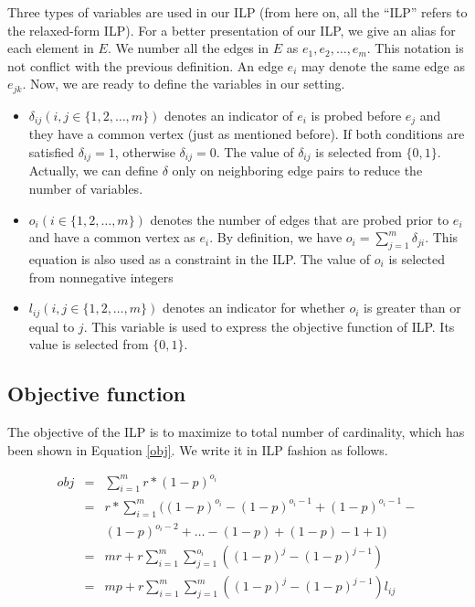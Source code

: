 \documentclass[letterpaper]{article}
\begin{document}
Three types of variables are used in our ILP (from here on, all the ``ILP'' refers to the relaxed-form ILP).
For a better presentation of our ILP, we give an alias for each element in $E$.
We number all the edges in $E$ as $e_1,e_2,\ldots,e_m$.
This notation is not conflict with the previous definition.
An edge $e_i$ may denote the same edge as $e_{jk}$.
Now, we are ready to define the variables in our setting.
\begin{itemize}
	\item $\delta_{ij}(i,j\in\{1,2,\ldots,m\})$ denotes an indicator of $e_i$ is probed before $e_j$ and they have a common vertex (just as mentioned before). If both conditions are satisfied $\delta_{ij}=1$, otherwise $\delta_{ij}=0$. The value of $\delta_{ij}$ is selected from $\{0,1\}$. Actually, we can define $\delta$ only on neighboring edge pairs to reduce the number of variables.
	\item $o_i(i\in\{1,2,\ldots,m\})$ denotes the number of edges that are probed prior to $e_i$ and have a common vertex as $e_i$. By definition, we have $o_i=\sum_{j=1}^{m}\delta_{ji}$. This equation is also used as a constraint in the ILP. The value of $o_i$ is selected from nonnegative integers
	\item $l_{ij}(i,j\in\{1,2,\ldots,m\})$ denotes an indicator for whether $o_i$ is greater than or equal to $j$. This variable is used to express the objective function of ILP. Its value is selected from $\{0,1\}$.
\end{itemize}

\subsection{Objective function}

The objective of the ILP is to maximize to total number of cardinality, which has been shown in Equation \ref{obj}.
We write it in ILP fashion as follows.

\begin{eqnarray}
	obj&=&\sum_{i=1}^{m}r*(1-p)^{o_i}\label{simple}\\
	&= & r*\sum_{i=1}^{m} ((1-p)^{o_i}-(1-p)^{o_{i}-1}+(1-p)^{o_{i}-1}-\nonumber\\
	&&(1-p)^{o_{i}-2}+\ldots-(1-p)+(1-p)-1+1)\\
	&=& mr+r\sum_{i=1}^{m}\sum_{j=1}^{o_i}((1-p)^j-(1-p)^{j-1})\\
	&=& mp+r\sum_{i=1}^{m}\sum_{j=1}^{m}((1-p)^j-(1-p)^{j-1})l_{ij}\label{fobj}
\end{eqnarray}
\end{document}
